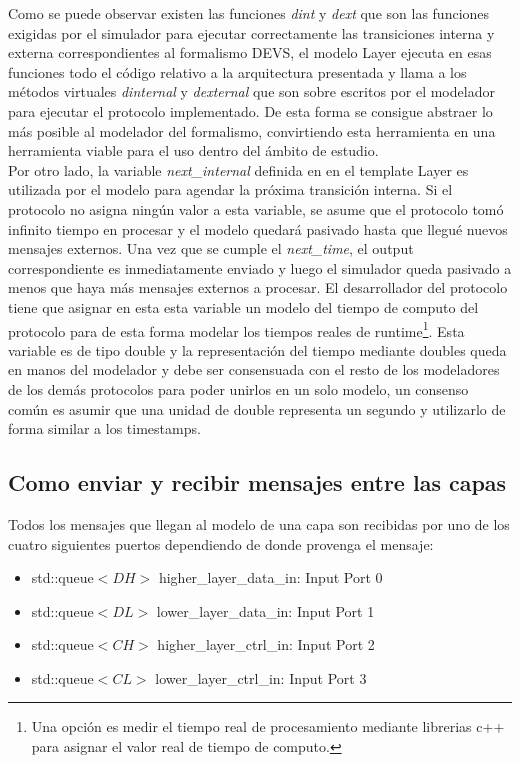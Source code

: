 \documentclass[10pt,a4paper]{article}
\begin{document}
Como se puede observar existen las funciones \textit{dint} y \textit{dext} que son las funciones exigidas por el simulador para ejecutar correctamente las transiciones interna y externa correspondientes al formalismo DEVS, el modelo Layer ejecuta en esas funciones todo el código relativo a la arquitectura presentada y llama a los métodos virtuales \textit{dinternal} y \textit{dexternal} que son sobre escritos por el modelador para ejecutar el protocolo implementado. De esta forma se consigue abstraer lo más posible al modelador del formalismo, convirtiendo esta herramienta en una herramienta viable para el uso dentro del ámbito de estudio. \\

Por otro lado, la variable \textit{next\_internal} definida en en el template Layer es utilizada por el modelo para agendar la próxima transición interna. Si el protocolo no asigna ningún valor a esta variable, se asume que el protocolo tomó infinito tiempo en procesar y el modelo quedará pasivado hasta que llegué nuevos mensajes externos. Una vez que se cumple el \textit{next\_time}, el output correspondiente es inmediatamente enviado y luego el simulador queda pasivado a menos que haya más mensajes externos a procesar. El desarrollador del protocolo tiene que asignar en esta esta variable un modelo del tiempo de computo del protocolo para de esta forma modelar los tiempos reales de runtime\footnote{Una opción es medir el tiempo real de procesamiento mediante librerias c++ para asignar el valor real de tiempo de computo.}. Esta variable es de tipo double y la representación del tiempo mediante doubles queda en manos del modelador y debe ser consensuada con el resto de los modeladores de los demás protocolos para poder unirlos en un solo modelo, un consenso común es asumir que una unidad de double representa un segundo y utilizarlo de forma similar a los timestamps. \\

\subsection{Como enviar y recibir mensajes entre las capas}

Todos los mensajes que llegan al modelo de una capa son recibidas por uno de los cuatro siguientes puertos dependiendo de donde provenga el mensaje:
\begin{itemize}
\item std::queue$<DH>$ higher\_layer\_data\_in:  Input Port 0
\item std::queue$<DL>$ lower\_layer\_data\_in:   Input Port 1
\item std::queue$<CH>$ higher\_layer\_ctrl\_in:  Input Port 2 
\item std::queue$<CL>$ lower\_layer\_ctrl\_in:   Input Port 3
\end{itemize}
\end{document}
